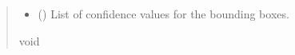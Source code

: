 \documentclass[letterpaper,10pt,english]{sphinxmanual}
\begin{document}
\begin{fulllineitems}
\begin{fulllineitems}
\begin{quote}
\begin{description}
\begin{itemize}
\item {} 
\sphinxAtStartPar
{} (\sphinxstyleliteralemphasis{\sphinxupquote{{[}}}\sphinxstyleliteralemphasis{\sphinxupquote{{]}}}) \textendash{} List of confidence values for the bounding boxes.

\end{itemize}

\sphinxAtStartPar
void

\end{description}\end{quote}

\end{fulllineitems}


\end{fulllineitems}

\end{document}
